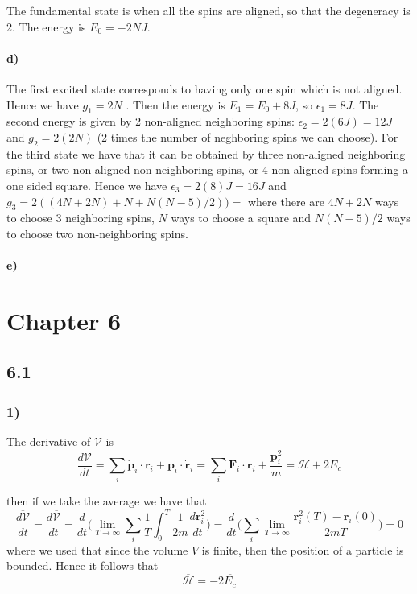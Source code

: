 \documentclass[10pt,a4paper]{book}
\begin{document}
The fundamental state is when all the spins are aligned, so that the degeneracy is 2. The energy is $E_0=-2NJ$. 

\subsubsection*{d)}
The first excited state corresponds to having only one spin which is not aligned. Hence we have $g_1=2N$ . Then the energy is $E_1=E_0+8J$, so $\epsilon_1=8J$. The second energy is given by 2 non-aligned neighboring spins:
$\epsilon_2=2(6J)=12J$ and $g_2=2(2N)$ (2 times the number of neghboring spins we can choose). For the third state we have that it can be obtained by three non-aligned neighboring spins, or two non-aligned non-neighboring spins, or 4 non-aligned spins forming a one sided square. Hence we have $\epsilon_3=2(8)J=16J$ and $g_3=2((4N+2N)+N+N(N-5)/2))=$
where there are $4N+2N$ ways to choose 3 neighboring spins, $N$ ways to choose a square and $N(N-5)/2$ ways to choose two non-neighboring spins.

\subsubsection*{e)}








\chapter*{Chapter 6}


\section*{6.1}
\subsection*{1)}
The derivative of $\mathscr{V}$ is 
$$\frac{d\mathscr{V}}{dt}=\sum_i\dot{\mathbf{p}}_i\cdot \mathbf{r}_i+\mathbf{p}_i\cdot\dot{\mathbf{r}}_i=\sum_i\mathbf{F}_i\cdot \mathbf{r}_i+\frac{\mathbf{p}_i^2}{m}=\mathscr{H}+2E_c$$

then  if we take the average we have that
$$\overline{\frac{d\mathscr{V}}{dt}}=\frac{d\overline{\mathscr{V}}}{dt}=\frac{d}{dt}\bigg(\lim_{T\to\infty}\sum_i\frac{1}{T}\int_0^T\frac{1}{2m}\frac{d\mathbf{r}_i^2}{dt}\bigg)=\frac{d}{dt}\bigg(\sum_i\lim_{T\to\infty}\frac{\mathbf{r}_i^2(T)-\mathbf{r}_i(0)}{2mT}\bigg)=0$$
where we used that since the volume $V$ is finite, then the position of a particle is bounded. Hence it follows that 
$$\overline{\mathscr{H}}=-2\overline{E_c}$$
\end{document}
